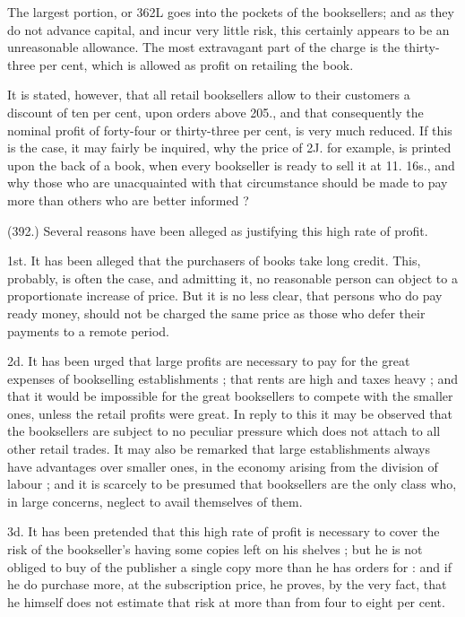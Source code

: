 \documentclass{article}
\begin{document}
The largest portion, or 362L goes into the pockets of the booksellers; and as they do not advance capital, and incur very little risk, this certainly appears to be an unreasonable allowance. The most extravagant part of the charge is the thirty-three per cent, which is allowed as profit on retailing the book.


It is stated, however, that all retail booksellers allow to their customers a discount of ten per cent, upon orders above 205., and that consequently the nominal profit of forty-four or thirty-three per cent, is very much reduced. If this is the case, it may fairly be inquired, why the price of 2J. for example, is printed upon the back of a book, when every bookseller is ready to sell it at 11. 16s., and why those who are unacquainted with that circumstance should be made to pay more than others who are better informed ?


(392.) Several reasons have been alleged as justifying this high rate of profit.


1st. It has been alleged that the purchasers of books take long credit. This, probably, is often the case, and admitting it, no reasonable person can object to a proportionate increase of price. But it is no less clear, that persons who do pay ready money, should not be charged the same price as those who defer their payments to a remote period.


2d. It has been urged that large profits are necessary to pay for the great expenses of bookselling establishments ; that rents are high and taxes heavy ; and that it would be impossible for the great booksellers to compete with the smaller ones, unless the retail profits were great. In reply to this it may be observed that the booksellers are subject to no peculiar pressure which does not attach to all other retail trades. It may also be remarked that large establishments always have advantages over smaller ones, in the economy arising from the division of labour ; and it is scarcely to be presumed that booksellers are the only class who, in large concerns, neglect to avail themselves of them.


3d. It has been pretended that this high rate of profit is necessary to cover the risk of the bookseller's having some copies left on his shelves ; but he is not obliged to buy of the publisher a single copy more than he has orders for : and if he do purchase more, at the subscription price, he proves, by the very fact, that he himself does not estimate that risk at more than from four to eight per cent.
\end{document}
